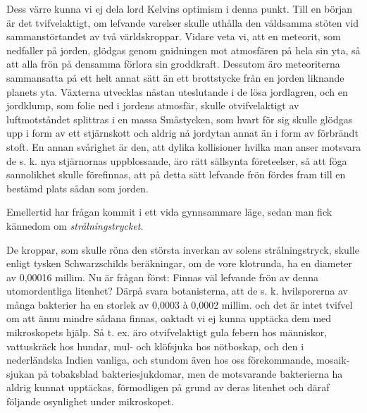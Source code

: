 \documentclass[a4paper, 12pt, oneside, swedish]{article}
\begin{document}
Dess värre kunna vi ej dela lord Kelvins optimism i denna punkt. Till en början är det tvifvelaktigt, om lefvande varelser skulle uthålla den våldsamma stöten vid sammanstörtandet av två världskroppar. Vidare veta vi, att en meteorit, som nedfaller på jorden, glödgas genom gnidningen mot atmosfären på hela sin yta, så att alla frön på densamma förlora sin groddkraft. Dessutom äro meteoriterna sammansatta på ett helt annat sätt än ett brottstycke från en jorden liknande planets yta. Växterna utvecklas nästan uteslutande i de lösa jordlagren, och en jordklump, som folie ned i jordens atmosfär, skulle otvifvelaktigt av luftmotståndet splittras i en massa Småstycken, som hvart för sig skulle glödgas upp i form av ett stjärnskott och aldrig nå jordytan annat än i form av förbrändt stoft. En annan svårighet är den, att dylika kollisioner hvilka man anser motsvara de s. k. nya stjärnornas uppblossande, äro rätt sällsynta företeelser, så att föga sannolikhet skulle förefinnas, att på detta sätt lefvande frön fördes fram till en bestämd plats sådan som jorden.

Emellertid har frågan kommit i ett vida gynnsammare läge, sedan man fick kännedom om \emph{strålningstrycket}.

De kroppar, som skulle röna den största inverkan av solens strålningstryck, skulle enligt tysken Schwarzschilds beräkningar, om de vore klotrunda, ha en diameter av 0,00016 millim. Nu är frågan först: Finnas väl lefvande frön av denna utomordentliga litenhet? Därpå svara botanisterna, att de s. k. hvilsporerna av många bakterier ha en storlek av 0,0003 à 0,0002 millim. och det är intet tvifvel om att ännu mindre sådana finnas, oaktadt vi ej kunna upptäcka dem med mikroskopets hjälp. Så t. ex. äro otvifvelaktigt gula febern hos människor, vattuskräck hos hundar, mul- och klöfsjuka hos nötboskap, och den i nederländska Indien vanliga, och stundom även hos oss förekommande, mosaik-sjukan på tobaksblad bakteriesjukdomar, men de motsvarande bakterierna ha aldrig kunnat upptäckas, förmodligen på grund av deras litenhet och däraf följande osynlighet under mikroskopet.
\end{document}
